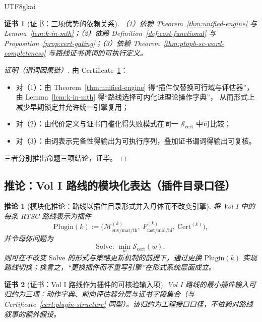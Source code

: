 \documentclass[12pt]{article}
\newtheorem{corollary}{推论}[section]
\newtheorem{certificate}{证书}[section]
\newcommand{\RTSC}{\textsf{RTSC}}
\begin{document}
\begin{CJK*}{UTF8}{gkai}
\begin{certificate}[证书：三项优势的依赖关系]
\label{cert:three-advantages-deps}
（1）依赖 Theorem~\ref{thm:unified-engine} 与 Lemma~\ref{lem:k-in-mth}；（2）依赖 Definition~\ref{def:cost-functional} 与
  Proposition~\ref{prop:cert-gating}；（3）依赖 Theorem~\ref{thm:ptopb-sc-word-completeness} 与路线证书谓词的可执行定义。
\end{certificate}

\begin{proof}[证明（谓词因果链）]
由 Certificate~\ref{cert:three-advantages-deps}：
\begin{itemize}
  \item 对（1）：由 Theorem~\ref{thm:unified-engine} 得“插件仅替换可行域与评估器”，由 Lemma~\ref{lem:k-in-mth} 得“路线选择可内化进理论操作字典”，
    从而形式上减少早期锁定并允许统一引擎复用；
  \item 对（2）：由代价定义与证书门槛化得失败模式在同一 $\mathcal{S}_{\mathrm{cert}}$ 中可比较；
  \item 对（3）：由词表示完备性得输出为可执行序列，叠加证书谓词得输出可复核。
\end{itemize}
三者分别推出命题三项结论，证毕。
\end{proof}

\subsection{推论：Vol I 路线的模块化表达（插件目录口径）}

\begin{corollary}[模块化推论：路线以插件目录形式并入母体而不改变引擎]
\label{cor:plugin-catalog}
将 Vol I 中的每条 \RTSC{} 路线表示为插件
\[
\mathrm{Plugin}(k):=\bigl(\mathcal{M}^{(k)}_{\mathrm{env/mat/th}},\ F^{(k)}_{\mathrm{fast/mid/hi}},\ \mathrm{Cert}^{(k)}
  \bigr),
\]
并令母体问题为
\[
\mathrm{Solve}:\ \min_{w}\mathcal{S}_{\mathrm{cert}}(w),
\]
则可在不改变 $\mathrm{Solve}$ 的形式与策略更新机制的前提下，通过更换 $\mathrm{Plugin}(k)$ 实现路线切换；换言之，“更换插件而不重写引擎”在形式系统层面成立。
\end{corollary}

\begin{certificate}[证书：Vol I 路线作为插件的可核验输入项]
\label{cert:vol1-plugin}
Vol I 路线的最小插件输入可归约为三项：动作字典、前向评估器分层与证书字段集合（与 Certificate~\ref{cert:plugin-structure} 同型）。该归约为工程接口口径，不依赖对路线叙事的额外假设。
\end{certificate}


\end{CJK*}
\end{document}
